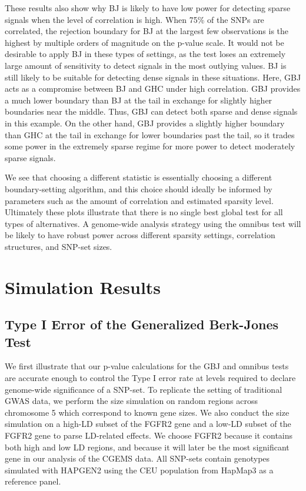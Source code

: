 \documentclass[12pt]{article}
\begin{document}
These results also show why BJ is likely to have low power for detecting sparse signals
when the level of correlation is high. 
When 75\% of the SNPs are correlated, the rejection boundary for BJ at the largest few observations
is the highest by multiple orders of magnitude on the p-value scale.
It would not be desirable to apply BJ in these types of settings,
as the test loses an extremely large amount of sensitivity to detect
signals in the most outlying values. 
BJ is still likely to be suitable for detecting dense signals in these situations.
Here, GBJ acts as a compromise between BJ and GHC under high correlation.
GBJ provides a much lower boundary than BJ at the tail in exchange for slightly
higher boundaries near the middle. 
Thus, GBJ can detect both sparse and dense signals in this example.
On the other hand, GBJ provides a slightly higher boundary than GHC at the tail in 
exchange for lower boundaries past the tail, so it trades some power in the 
extremely sparse regime for more power to detect moderately sparse signals.


We see that choosing a different statistic is essentially choosing a different boundary-setting 
algorithm, and this choice should ideally be informed by parameters such as the amount of 
correlation and estimated sparsity level.
Ultimately these plots illustrate that there is no single best global test for all types
of alternatives. 
A genome-wide analysis strategy using the omnibus test will be likely to 
have robust power across different sparsity settings, correlation
structures, and SNP-set sizes.


\section{Simulation Results}
\label{p2_sec:simulation}

\subsection{Type I Error of the Generalized Berk-Jones Test}
\label{p2_sss:TypeIerr}

We first illustrate that our p-value calculations for the GBJ and omnibus tests are accurate enough to control
the Type I error rate at levels required to declare genome-wide significance of a SNP-set. 
To replicate the setting of traditional GWAS data, we perform the size simulation 
on random regions across chromosome 5 which correspond to known gene sizes.
We also conduct the size simulation on a high-LD subset of the FGFR2 gene
and a low-LD subset of the FGFR2 gene to parse LD-related effects.
We choose FGFR2 because it contains both high and low LD regions,
and because it will later be the most significant gene in our analysis
of the CGEMS data.
All SNP-sets contain genotypes simulated with HAPGEN2 \citep*{HAPGEN2} using the CEU population 
from HapMap3 as a reference panel.
\end{document}
